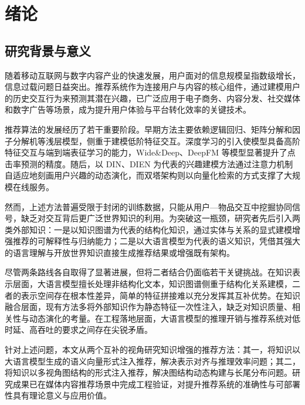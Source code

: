 
\chapter{绪论}
\label{cha:introduction}

\section{研究背景与意义}
\label{sec:background}

随着移动互联网与数字内容产业的快速发展，用户面对的信息规模呈指数级增长，信息过载问题日益突出。推荐系统作为连接用户与内容的核心组件，通过建模用户的历史交互行为来预测其潜在兴趣，已广泛应用于电子商务、内容分发、社交媒体和数字广告等场景，成为提升用户体验与平台转化效率的关键技术\cite{zhang2019deep, li2024recent}。

推荐算法的发展经历了若干重要阶段。早期方法主要依赖逻辑回归、矩阵分解和因子分解机等浅层模型，侧重于建模低阶特征交互\cite{koren2009mf, rendle2010fm}。深度学习的引入使模型具备高阶特征交互与端到端表征学习的能力，Wide\&Deep、DeepFM 等模型显著提升了点击率预测的精度\cite{cheng2016wide, guo2017deepfm}。随后，以 DIN、DIEN 为代表的兴趣建模方法通过注意力机制自适应地刻画用户兴趣的动态演化\cite{zhou2018din, zhou2019dien}，而双塔架构则以向量化检索的方式支撑了大规模在线服务\cite{huang2013dssm}。

然而，上述方法普遍受限于封闭的训练数据，只能从用户—物品交互中挖掘协同信号，缺乏对交互背后更广泛世界知识的利用。为突破这一瓶颈，研究者先后引入两类外部知识：一是以知识图谱为代表的结构化知识，通过实体与关系的显式建模增强推荐的可解释性与归纳能力\cite{wang2019kgat, wang2021kgin}；二是以大语言模型为代表的语义知识，凭借其强大的语言理解与开放世界知识直接生成推荐结果或增强既有架构\cite{zhao2024llmrec, wu2024llm4rec}。

尽管两条路线各自取得了显著进展，但将二者结合仍面临若干关键挑战。在知识表示层面，大语言模型擅长处理非结构化文本，知识图谱侧重于结构化关系建模，二者的表示空间存在根本性差异，简单的特征拼接难以充分发挥其互补优势。在知识融合层面，现有方法多将外部知识作为静态特征一次性注入，缺乏对知识质量、相关性与动态演化的考量。在工程落地层面，大语言模型的推理开销与推荐系统对低时延、高吞吐的要求之间存在尖锐矛盾。

针对上述问题，本文从两个互补的视角研究知识增强的推荐方法：其一，将知识以大语言模型生成的语义向量形式注入推荐，解决表示对齐与推理效率问题；其二，将知识以多视角图结构的形式注入推荐，解决图结构动态构建与长尾分布问题。研究成果已在媒体内容推荐场景中完成工程验证，对提升推荐系统的准确性与可部署性具有理论意义与应用价值。

